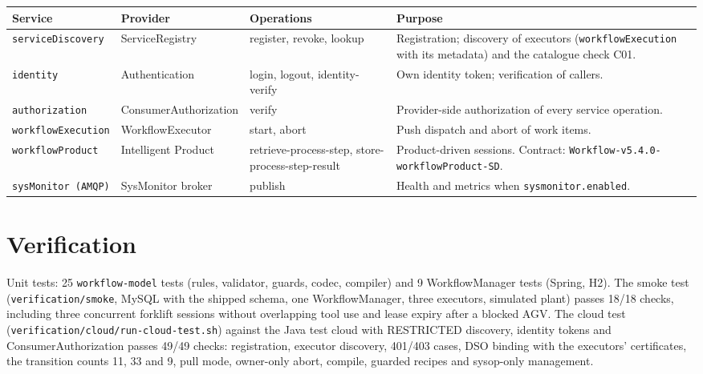 \documentclass[a4paper]{arrowhead}
\begin{document}
{\small
\begin{longtable}{|p{3.4cm}|p{3.2cm}|p{3.6cm}|p{5.6cm}|}

\hline
\rowcolor{gray!33} Service & Provider & Operations & Purpose \\ \hline
\endhead
\texttt{serviceDiscovery} & ServiceRegistry & register, revoke, lookup & Registration; discovery of executors (\texttt{workflowExecution} with its metadata) and the catalogue check C01. \\ \hline
\texttt{identity} & Authentication & login, logout, identity-verify & Own identity token; verification of callers. \\ \hline
\texttt{authorization} & ConsumerAuthorization & verify & Provider-side authorization of every service operation. \\ \hline
\texttt{workflowExecution} & WorkflowExecutor & start, abort & Push dispatch and abort of work items. \\ \hline
\texttt{workflowProduct} & Intelligent Product & retrieve-process-step, store-process-step-result & Product-driven sessions. Contract: \texttt{Workflow-v5.4.0-workflowProduct-SD}. \\ \hline
\texttt{sysMonitor (AMQP)} & SysMonitor broker & publish & Health and metrics when \texttt{sysmonitor.enabled}. \\ \hline
\end{longtable}
}


\section{Verification}
\label{sec:verification}
Unit tests: 25 \texttt{workflow-model} tests (rules, validator, guards, codec, compiler) and 9 WorkflowManager tests
(Spring, H2). The smoke test (\texttt{verification/smoke}, MySQL with the shipped schema, one WorkflowManager, three
executors, simulated plant) passes 18/18 checks, including three concurrent forklift sessions without overlapping tool
use and lease expiry after a blocked AGV. The cloud test (\texttt{verification/cloud/run-cloud-test.sh}) against the
Java test cloud with RESTRICTED discovery, identity tokens and ConsumerAuthorization passes 49/49 checks: registration,
executor discovery, 401/403 cases, DSO binding with the executors' certificates, the transition counts 11, 33 and 9,
pull mode, owner-only abort, compile, guarded recipes and sysop-only management.
\end{document}
